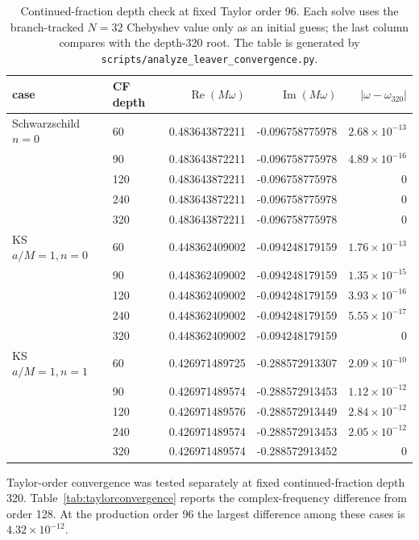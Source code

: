 \documentclass[12pt,a4paper]{article}
\begin{document}
\color{blue}
\begin{table}[H]
\centering
\scriptsize
\renewcommand{\arraystretch}{1.08}
\begin{tabular}{llrrr}
\toprule
case & CF depth & \(\operatorname{Re}(M\omega)\) &
\(\operatorname{Im}(M\omega)\) & \(|\omega-\omega_{320}|\)\\
\midrule
Schwarzschild \(n=0\) & 60  & 0.483643872211 & -0.096758775978 & \(2.68\times10^{-13}\)\\
 & 90  & 0.483643872211 & -0.096758775978 & \(4.89\times10^{-16}\)\\
 & 120 & 0.483643872211 & -0.096758775978 & \(0\)\\
 & 240 & 0.483643872211 & -0.096758775978 & \(0\)\\
 & 320 & 0.483643872211 & -0.096758775978 & \(0\)\\
\addlinespace
KS \(a/M=1,n=0\) & 60  & 0.448362409002 & -0.094248179159 & \(1.76\times10^{-13}\)\\
 & 90  & 0.448362409002 & -0.094248179159 & \(1.35\times10^{-15}\)\\
 & 120 & 0.448362409002 & -0.094248179159 & \(3.93\times10^{-16}\)\\
 & 240 & 0.448362409002 & -0.094248179159 & \(5.55\times10^{-17}\)\\
 & 320 & 0.448362409002 & -0.094248179159 & \(0\)\\
\addlinespace
KS \(a/M=1,n=1\) & 60  & 0.426971489725 & -0.288572913307 & \(2.09\times10^{-10}\)\\
 & 90  & 0.426971489574 & -0.288572913453 & \(1.12\times10^{-12}\)\\
 & 120 & 0.426971489576 & -0.288572913449 & \(2.84\times10^{-12}\)\\
 & 240 & 0.426971489574 & -0.288572913453 & \(2.05\times10^{-12}\)\\
 & 320 & 0.426971489574 & -0.288572913452 & \(0\)\\
\bottomrule
\end{tabular}
\caption{Continued-fraction depth check at fixed Taylor order 96.  Each solve
uses the branch-tracked \(N=32\) Chebyshev value only as an initial guess; the
last column compares with the depth-320 root.  The table is generated by
\texttt{scripts/analyze\_leaver\_convergence.py}.}
\label{tab:cfconvergence}
\end{table}

Taylor-order convergence was tested separately at fixed continued-fraction
depth 320.  Table~\ref{tab:taylorconvergence} reports the complex-frequency
difference from order 128.  At the production order 96 the largest difference
among these cases is \(4.32\times10^{-12}\).
\end{document}
